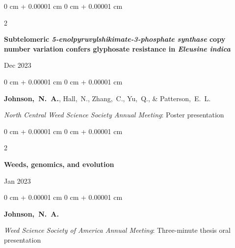 \documentclass[10pt, letterpaper]{article}
\newenvironment{onecolentry}{
    \begin{adjustwidth}{
        0 cm + 0.00001 cm
    }{
        0 cm + 0.00001 cm
    }
}{
    \end{adjustwidth}
} %
\newenvironment{twocolentry}[2][]{
    \onecolentry
    \def\secondColumn{#2}
    \setcolumnwidth{\fill, 4.5 cm}
    \begin{paracol}{2}
}{
    \switchcolumn \raggedleft \secondColumn
    \end{paracol}
    \endonecolentry
} %
\begin{document}
        \vspace{0.2 cm}
        

        \begin{samepage}
            \begin{twocolentry}{
                Dec 2023
            }
                \textbf{Subtelomeric \textit{5-enolpyruvylshikimate-3-phosphate synthase} copy number variation confers glyphosate resistance in \textit{Eleusine indica}}
            \end{twocolentry}

            \vspace{0.10 cm}
            
            \begin{onecolentry}
                \mbox{\textbf{Johnson, N. A.}}, \mbox{Hall, N.}, \mbox{Zhang, C.}, \mbox{Yu, Q.}, \& \mbox{Patterson, E. L.}

                \vspace{0.10 cm}
                
                \textit{North Central Weed Science Society Annual Meeting}: Poster presentation
            \end{onecolentry}
        \end{samepage}


        \vspace{0.2 cm}
        

        \begin{samepage}
            \begin{twocolentry}{
                Jan 2023
            }
                \textbf{Weeds, genomics, and evolution}
            \end{twocolentry}

            \vspace{0.10 cm}
            
            \begin{onecolentry}
                \mbox{\textbf{Johnson, N. A.}}

                \vspace{0.10 cm}
                
                \textit{Weed Science Society of America Annual Meeting}: Three-minute thesis oral presentation
            \end{onecolentry}
        \end{samepage} 


        \vspace{0.2 cm}
        
\end{document}
